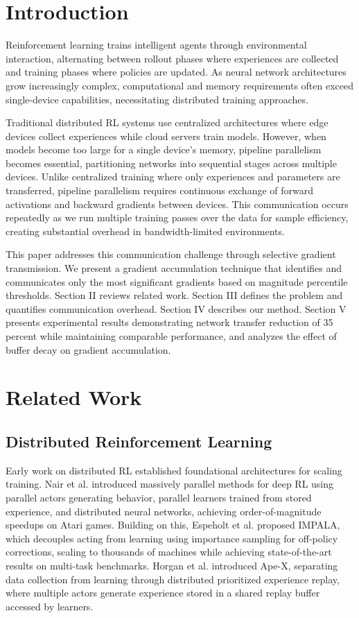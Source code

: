 \documentclass[conference]{IEEEtran}
\begin{document}
\section{Introduction}

Reinforcement learning trains intelligent agents through environmental interaction, alternating between rollout phases where experiences are collected and training phases where policies are updated. As neural network architectures grow increasingly complex, computational and memory requirements often exceed single-device capabilities, necessitating distributed training approaches.

Traditional distributed RL systems use centralized architectures where edge devices collect experiences while cloud servers train models. However, when models become too large for a single device's memory, pipeline parallelism becomes essential, partitioning networks into sequential stages across multiple devices. Unlike centralized training where only experiences and parameters are transferred, pipeline parallelism requires continuous exchange of forward activations and backward gradients between devices. This communication occurs repeatedly as we run multiple training passes over the data for sample efficiency, creating substantial overhead in bandwidth-limited environments.

This paper addresses this communication challenge through selective gradient transmission. We present a gradient accumulation technique that identifies and communicates only the most significant gradients based on magnitude percentile thresholds. Section II reviews related work. Section III defines the problem and quantifies communication overhead. Section IV describes our method. Section V presents experimental results demonstrating network transfer reduction of 35 percent while maintaining comparable performance, and analyzes the effect of buffer decay on gradient accumulation.

\section{Related Work}

\subsection{Distributed Reinforcement Learning}

Early work on distributed RL established foundational architectures for scaling training. Nair et al. \cite{nair2015} introduced massively parallel methods for deep RL using parallel actors generating behavior, parallel learners trained from stored experience, and distributed neural networks, achieving order-of-magnitude speedups on Atari games. Building on this, Espeholt et al. \cite{impala2018} proposed IMPALA, which decouples acting from learning using importance sampling for off-policy corrections, scaling to thousands of machines while achieving state-of-the-art results on multi-task benchmarks. Horgan et al. \cite{apex2018} introduced Ape-X, separating data collection from learning through distributed prioritized experience replay, where multiple actors generate experience stored in a shared replay buffer accessed by learners.
\end{document}
